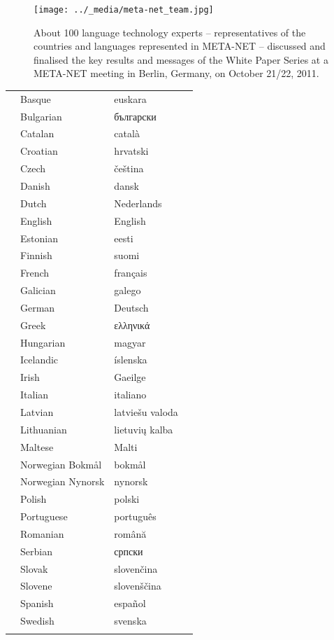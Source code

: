 \documentclass[]{../../metanetpaper}
\begin{document}
\renewcommand*{\figureformat}{}
\renewcommand*{\captionformat}{}

\begin{figure}[p]
  \center
  \texttt{[image: ../\_media/meta-net\_team.jpg]}
  \caption{About 100 language technology experts -- representatives of the countries and languages represented in META-NET -- discussed and finalised the key results and messages of the White Paper Series at a META-NET meeting in Berlin, Germany, on October 21/22, 2011.}
  \medskip
\end{figure}

\cleardoublepage

\label{whitepaperseries}

\vspace*{-5mm}
\centering
  \setlength{\tabcolsep}{3.7em}
  \begin{tabularx}{\textwidth}{llll} \toprule\addlinespace
& Basque & euskara& \\
& Bulgarian & български& \\
& Catalan & català& \\
& Croatian & hrvatski& \\
& Czech & čeština& \\
& Danish & dansk& \\
& Dutch & Nederlands& \\
& English & English& \\
& Estonian & eesti& \\
& Finnish & suomi& \\
& French & français& \\
& Galician & galego& \\
& German & Deutsch& \\
& Greek & ελληνικά& \\
& Hungarian & magyar& \\
& Icelandic & íslenska& \\
& Irish & Gaeilge& \\
& Italian & italiano& \\
& Latvian & latviešu valoda& \\
& Lithuanian & lietuvių kalba& \\
& Maltese & Malti& \\
& Norwegian Bokmål & bokmål& \\
& Norwegian Nynorsk & nynorsk& \\
& Polish & polski& \\
& Portuguese & português& \\
& Romanian & română& \\
& Serbian & српски& \\
& Slovak & slovenčina& \\
& Slovene & slovenščina& \\
& Spanish & español& \\
& Swedish & svenska& \\ \addlinespace \bottomrule
\end{tabularx}
\end{document}
